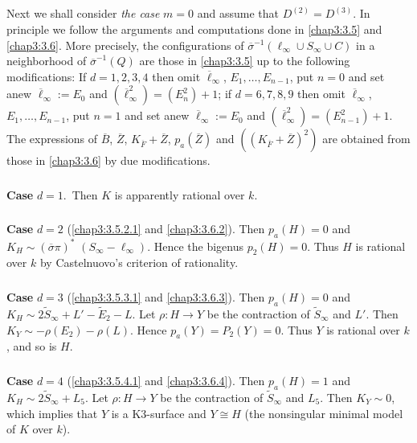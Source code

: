 \subsection{}\label{chap3:3.7}
Next we shall consider {\em the case} $m=0$ and assume that
$D^{(2)}=D^{(3)}$. In principle we follow the arguments and
computations done in \ref{chap3:3.5} and \ref{chap3:3.6}. More precisely, the
configurations of $\overline{\sigma}^{-1}(\ell_{\infty}\cup
S_{\infty}\cup C)$ in a neighborhood of $\overline{\sigma}^{-1}(Q)$
are those in \ref{chap3:3.5} up to the following modifications: If
$d=1,2,3,4$ then omit $\overline{\ell}_{\infty}$,
$E_{1},\ldots,E_{n-1}$, put $n=0$ and set anew
$\overline{\ell}_{\infty}:=E_{0}$ and
$(\overline{\ell}^{2}_{\infty})=(E^{2}_{n})+1$; if $d=6,7,8,9$ then
omit $\overline{\ell}_{\infty}$, $E_{1},\ldots,E_{n-1}$, put $n=1$ and
set anew $\overline{\ell}_{\infty}:=E_{0}$ and
$(\overline{\ell}^{2}_{\infty})=(E^{2}_{n-1})+1$. The expressions of
$\overline{B}$, $\overline{Z}$, $K_{\overline{F}}+\overline{Z}$,
$p_{a}(\overline{Z})$ and $((K_{\overline{F}}+\overline{Z})^{2})$ are
obtained from those in \ref{chap3:3.6} by due modifications. 

\subsubsection{}\label{chap3:3.7.1}
{\bf Case} $d=1$.\pageoriginale\ Then $K$ is apparently rational over $k$.

\subsubsection{}\label{chap3:3.7.2}
{\bf Case} $d=2$ (\cf \ref{chap3:3.5.2.1} and \ref{chap3:3.6.2}). Then
$p_{a}(H)=0$ and
$K_{H}\sim(\overline{\sigma}\pi)^{\ast}$ $(S_{\infty}-\ell_{\infty})$. Hence
the bigenus $p_{2}(H)=0$. Thus $H$ is rational over $k$ by
Castelnuovo's criterion of rationality.

\subsubsection{}\label{chap3:3.7.3}
{\bf Case} $d=3$ (\cf \ref{chap3:3.5.3.1} and \ref{chap3:3.6.3}). Then
$p_{a}(H)=0$ and $K_{H}\sim
2\widetilde{S}_{\infty}+L'-\widetilde{E}_{2}-L$. Let $\rho:H\to Y$ be
the contraction of $\widetilde{S}_{\infty}$ and $L'$. Then $K_{Y}\sim
-\rho(E_{2})-\rho(L)$. Hence $p_{a}(Y)=P_{2}(Y)=0$. Thus $Y$ is
rational over $k$, and so is $H$.

\subsubsection{}\label{chap3:3.7.4}
{\bf Case} $d=4$ (\cf \ref{chap3:3.5.4.1} and \ref{chap3:3.6.4}). Then
$p_{a}(H)=1$ and $K_{H}\sim 2\widetilde{S}_{\infty}+L_{5}$. Let
$\rho:H\to Y$ be the contraction of $\widetilde{S}_{\infty}$ and
$L_{5}$. Then $K_{Y}\sim 0$, which implies that $Y$ is a K3-surface
and $Y\cong H$ (the nonsingular minimal model of $K$ over $k$).

